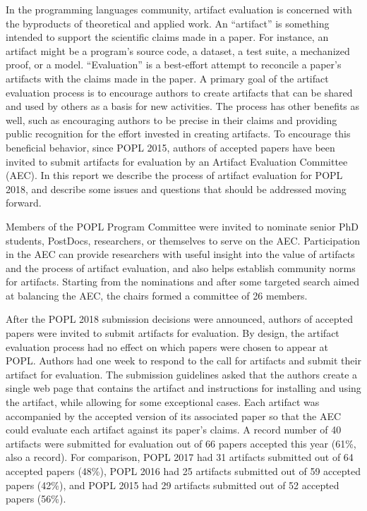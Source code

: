 \label{aec}

In the programming languages community, artifact evaluation is concerned with
the byproducts of theoretical and applied work. An ``artifact'' is something
intended to support the scientific claims made in a paper. For instance, an
artifact might be a program’s source code, a dataset, a test suite, a mechanized
proof, or a model. ``Evaluation'' is a best-effort attempt to reconcile a paper’s
artifacts with the claims made in the paper. A primary goal of the artifact
evaluation process is to encourage authors to create artifacts that can be
shared and used by others as a basis for new activities. The process has other
benefits as well, such as encouraging authors to be precise in their claims and
providing public recognition for the effort invested in creating artifacts. To
encourage this beneficial behavior, since POPL 2015, authors of accepted papers
have been invited to submit artifacts for evaluation by an Artifact Evaluation
Committee (AEC). In this report we describe the process of artifact evaluation
for POPL 2018, and describe some issues and questions that should be addressed
moving forward.

Members of the POPL Program Committee were invited to nominate senior PhD
students, PostDocs, researchers, or themselves to serve on the AEC.
Participation in the AEC can provide researchers with useful insight into the
value of artifacts and the process of artifact evaluation, and also helps
establish community norms for artifacts. Starting from the nominations and after
some targeted search aimed at balancing the AEC, the chairs formed a committee
of 26 members.

After the POPL 2018 submission decisions were announced, authors of accepted
papers were invited to submit artifacts for evaluation. By design, the artifact
evaluation process had no effect on which papers were chosen to appear at POPL.
Authors had one week to respond to the call for artifacts and submit their
artifact for evaluation. The submission guidelines asked that the authors create
a single web page that contains the artifact and instructions for installing and
using the artifact, while allowing for some exceptional cases. Each artifact was
accompanied by the accepted version of its associated paper so that the AEC
could evaluate each artifact against its paper’s claims. A record number of 40
artifacts were submitted for evaluation out of 66 papers accepted this year
(61\%, also a record). For comparison, POPL 2017 had 31 artifacts submitted out
of 64 accepted papers (48\%), POPL 2016 had 25 artifacts submitted out of 59
accepted papers (42\%), and POPL 2015 had 29 artifacts submitted out of 52
accepted papers (56\%).

